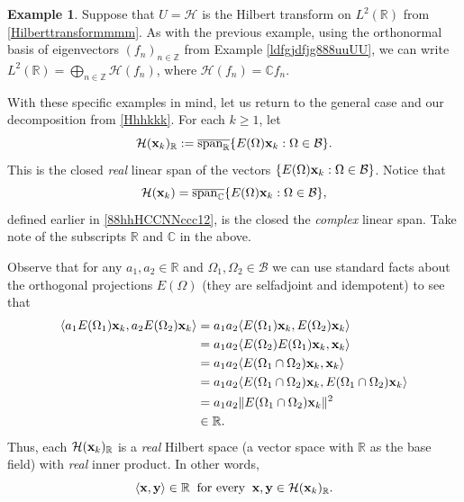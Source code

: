 \documentclass{dis}
\theoremstyle{plain}
\theoremstyle{definition}
\newtheorem{Example}[equation]{Example}
\def\C{\mathbb{C}}
\def\R{\mathbb{R}}
\def\Z{\mathbb{Z}}
\renewcommand{\geq}{\geqslant}
\renewcommand{\vec}[1]{{\bf #1}}
\newcommand{\0}{{\color{lightgray}0}}
\begin{document}
\begin{Example}\label{HTksdfsf}
Suppose that $U = \mathscr{H}$ is the Hilbert transform on $L^2(\R)$ from \eqref{Hilberttransformmmm}. As with the previous example, using the orthonormal basis of eigenvectors $(f_n)_{n \in \Z}$ from Example \ref{ldfgjdfjg888uuUU}, we can write $L^2(\R) = \bigoplus_{n \in \Z} \mathcal{H}(f_n)$, where $\mathcal{H}(f_n) = \C f_n$.
\end{Example}

With these specific examples in mind, let us return to the general case and our decomposition from \eqref{Hhhkkk}. For each $k \geq 1$, let
\begin{equation}\label{ahhhhhkkkkxxxrrr}
\mathcal{H}(\vec{x}_k)_{\R} := \overline{\operatorname{span}_{\R}}\{E(\Omega) \vec{x}_{k}: \Omega \in \mathcal{B}\}.
\end{equation}
 This is the closed {\em real} linear span of the vectors $\{E(\Omega) \vec{x}_k: \Omega \in \mathcal{B}\}$.
Notice that 
$$\mathcal{H}(\vec{x}_k) = \overline{\operatorname{span}_{\C}} \{E(\Omega) \vec{x}_k: \Omega \in \mathcal{B}\},$$
defined earlier in \eqref{88hhHCCNNccc12}, is the closed 
the {\em complex} linear span. Take note of the subscripts $\R$ and $\C$ in the above. 

  Observe that for any $a_1, a_2 \in \R$ and $\Omega_1, \Omega_2 \in \mathcal{B}$ we can use standard facts about the orthogonal projections $E(\Omega)$ (they are selfadjoint and idempotent) to see that 
\begin{align*}
\langle a_1 E(\Omega_1) \vec{x}_k, a_2 E(\Omega_2) \vec{x}_k\rangle & = a_1 a_2 \langle E(\Omega_1) \vec{x}_k, E(\Omega_2) \vec{x}_k\rangle\\
& = a_1 a_2 \langle E(\Omega_2) E(\Omega_1) \vec{x}_k, \vec{x}_k\rangle\\
& = a_1 a_2 \langle E(\Omega_1 \cap \Omega_2) \vec{x}_k, \vec{x}_k\rangle\\
& = a_1 a_2  \langle E(\Omega_1 \cap\Omega_2) \vec{x}_k,  E(\Omega_1 \cap \Omega_2)\vec{x}_k\rangle\\
& = a_1 a_2 \|E(\Omega_1 \cap \Omega_2) \vec{x}_k\|^2\\
& \in \R.
\end{align*}
Thus, each $\mathcal{H}(\vec{x}_k)_{\R}$ is a {\em real} Hilbert space (a vector space with $\R$ as the base field) with {\em real} inner product. In other words, 
\begin{equation}\label{reallll9}
\langle \vec{x}, \vec{y}\rangle \in \R \; \; \mbox{for every} \; \; \vec{x}, \vec{y} \in \mathcal{H}(\vec{x}_k)_{\R}.
\end{equation}
\end{document}
